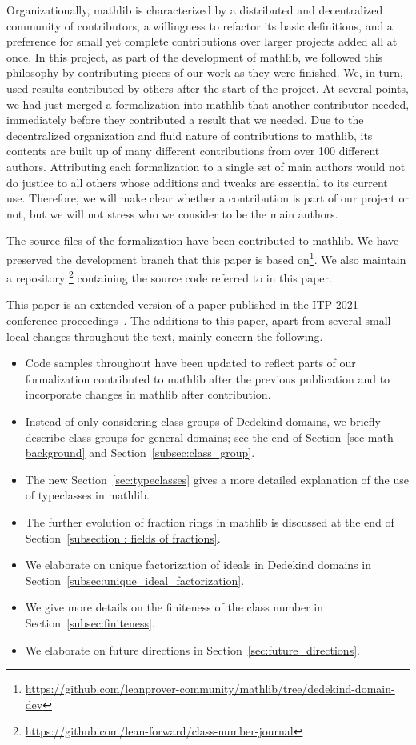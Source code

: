 \documentclass[sn-mathphys]{sn-jnl}%
\newcommand{\mathlib}{\textsf{mathlib}\xspace}
\begin{document}
Organizationally, \mathlib is characterized by a distributed and decentralized community of contributors, a willingness to refactor its basic definitions, and a preference for small yet complete contributions over larger projects added all at once.
In this project, as part of the development of \mathlib, we followed this philosophy by contributing pieces of our work as they were finished.
We, in turn, used results contributed by others after the start of the project.
At several points, we had just merged a formalization into \mathlib that another contributor needed,
immediately before they contributed a result that we needed.
Due to the decentralized organization and fluid nature of contributions to \mathlib, its contents are built up of many different contributions from over 100 different authors.
Attributing each formalization to a single set of main authors would not do justice to all others whose additions and tweaks are essential to its current use. Therefore, we will make clear whether a contribution is part of our project or not, but we will not stress who we consider to be the main authors.

The source files of the formalization have been contributed to \mathlib.
We have preserved the development branch that this paper is based on\footnote{\url{https://github.com/leanprover-community/mathlib/tree/dedekind-domain-dev}}.
We also maintain a
repository%
\footnote{\url{https://github.com/lean-forward/class-number-journal}}
containing the source code referred to in this paper.

This paper is an extended version of a paper published in the ITP 2021 conference proceedings~\cite{ClassGroupsITP2021}. The additions to this paper, apart from several small local changes throughout the text, mainly concern the following.
\begin{itemize}
 \item Code samples throughout have been updated to reflect parts of our formalization contributed to \mathlib after the previous publication and to incorporate changes in \mathlib after contribution.
 \item Instead of only considering class groups of Dedekind domains, we briefly describe class groups for general domains; see the end of Section~\ref{sec math background} and Section~\ref{subsec:class_group}.
 \item The new Section~\ref{sec:typeclasses} gives a more detailed explanation of the use of typeclasses in \mathlib.
 \item The further evolution of fraction rings in \mathlib is discussed at the end of Section~\ref{subsection : fields of fractions}.
 \item We elaborate on unique factorization of ideals in Dedekind domains in Section~\ref{subsec:unique_ideal_factorization}.
 \item We give more details on the finiteness of the class number in Section~\ref{subsec:finiteness}.
 \item We elaborate on future directions in Section~\ref{sec:future_directions}.
\end{itemize}
\end{document}
